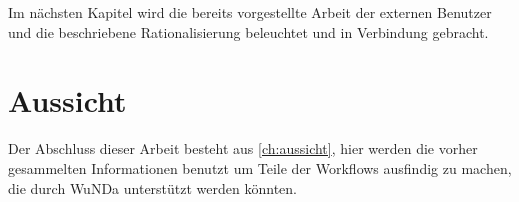 Im nächsten Kapitel wird die bereits vorgestellte Arbeit der externen Benutzer und die beschriebene Rationalisierung beleuchtet und in Verbindung gebracht.

\section{Aussicht}
Der Abschluss dieser Arbeit besteht aus \autoref{ch:aussicht}, hier werden die vorher gesammelten Informationen benutzt um Teile der Workflows ausfindig zu machen, die durch \ac{WuNDa} unterstützt werden könnten. 






